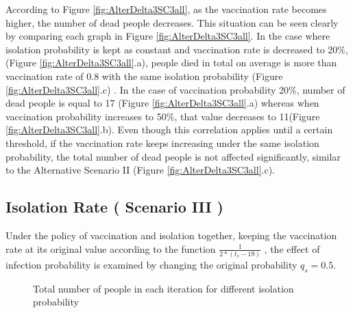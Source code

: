 \documentclass{article}
\begin{document}
According to Figure \ref{fig:AlterDelta3SC3all}, as the vaccination rate becomes higher, the number of dead people decreases. This situation can be seen clearly by comparing each graph in Figure \ref{fig:AlterDelta3SC3all}. In the case where isolation probability is kept as constant and vaccination rate is decreased to 20\%, (Figure \ref{fig:AlterDelta3SC3all}.a), people died in total on average is more than vaccination rate of 0.8 with the same isolation probability (Figure \ref{fig:AlterDelta3SC3all}.c) . In the case of vaccination probability 20\%, number of dead people is equal to 17 (Figure \ref{fig:AlterDelta3SC3all}.a) whereas when vaccination probability increases to 50\%, that value decreases to 11(Figure \ref{fig:AlterDelta3SC3all}.b). Even though this correlation applies until a certain threshold, if the vaccination rate keeps increasing under the same isolation probability, the total number of dead people is not affected significantly, similar to the Alternative Scenario II (Figure \ref{fig:AlterDelta3SC3all}.c).

\newpage

\subsection*{Isolation Rate ( Scenario III )}

\; \; Under the policy of vaccination and isolation together, keeping the vaccination rate at its original value according to the function $\frac{1}{2*(t_v-19)}$ , the effect of infection probability is examined by changing the original probability $q_s=0.5$.

\begin{figure}[h]
    \centering
    \qquad
    \qquad
    \caption{Total number of people in each iteration for different isolation probability}
    \label{fig:AlterQsSC3all}%
\end{figure}
\end{document}
